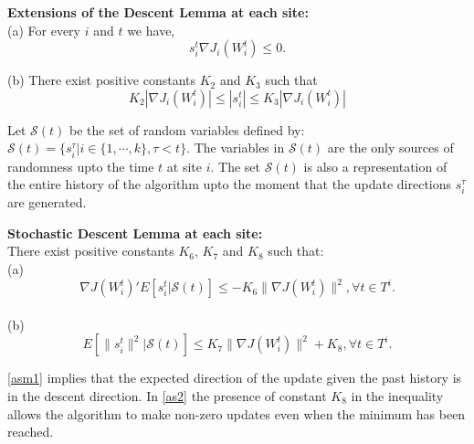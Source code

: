 \begin{asm}
\label{asm1}

\noindent \textbf{Extensions of the Descent Lemma \cite{Bertsekas_97} at each site:} \\ 
(a) For every $i$ and $t$ we have,
\begin{equation}
s_i^t \nabla J_i(W_i^{t}) \le 0.
\end{equation}

\noindent (b) There exist positive constants $K_2$ and $K_3$ such that
\begin{equation}
K_2 |\nabla J_i(W_i^{t})| \le |s_i^t| \le K_3 |\nabla J_i(W_i^{t})|
\end{equation}
\end{asm}



\noindent Let $\mathcal{S}(t)$ be the set of random variables defined by: 
$\mathcal{S}(t)=\{s_i^{\tau}| i \in \{1, \cdots,k \}, \tau < t \}$. The variables in $\mathcal{S}(t)$ are the only sources of randomness upto the time $t$ at site $i$. The set $\mathcal{S}(t)$ is also a representation of the entire history of the algorithm upto the moment that the update directions $s_i^{\tau}$ are generated.

\begin{asm}
\label{as2}

\noindent \textbf{Stochastic Descent Lemma \cite{Bertsekas_97} at each site:} \\
There exist positive constants $K_6$, $K_7$ and $K_8$ such that: \\
(a) \begin{equation}
\label{descent01}
\nabla J(W_i^{t})' E[s_i^t|\mathcal{S}(t)] \le - K_6 \parallel \nabla J(W_i^{t}) \parallel^2, \forall t \in T^i.
\end{equation} \\
(b)\begin{equation}
\label{descent02}
 E[\parallel s_i^t \parallel^2|\mathcal{S}(t)] \le K_7 \parallel \nabla J(W_i^{t}) \parallel^2 + K_8,  \forall t \in T^i.
\end{equation} 
\end{asm}
\noindent \ref{asm1} implies that the expected direction of the update given the past history is in the descent direction. In \ref{as2} the presence of constant $K_8$ in the inequality allows the algorithm to make non-zero updates even when the minimum has been reached. \\

